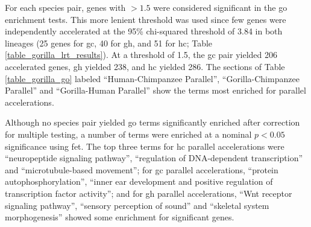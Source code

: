For each species pair, genes with \lrtmin$>1.5$ were considered
significant in the \ac{go} enrichment tests. This more lenient
threshold was used since few genes were independently accelerated at
the 95\% chi-squared threshold of 3.84 in both lineages (25 genes for
\ac{gc}, 40 for \ac{gh}, and 51 for \ac{hc}; Table
\ref{table_gorilla_lrt_results}). At a \lrtmin threshold of 1.5, the
\ac{gc} pair yielded 206 accelerated genes, \ac{gh} yielded 238, and
\ac{hc} yielded 286. The sections of Table \ref{table_gorilla_go}
labeled ``Human-Chimpanzee Parallel'', ``Gorilla-Chimpanzee Parallel''
and ``Gorilla-Human Parallel'' show the terms most enriched for
parallel accelerations.

Although no species pair yielded \ac{go} terms significantly enriched
after correction for multiple testing, a number of terms were enriched
at a nominal $p<0.05$ significance using \ac{fet}. The top three terms
for \ac{hc} parallel accelerations were ``neuropeptide signaling
pathway'', ``regulation of DNA-dependent transcription'' and
``microtubule-based movement''; for \ac{gc} parallel accelerations,
``protein autophosphorylation'', ``inner ear development and positive
regulation of transcription factor activity''; and for \ac{gh}
parallel accelerations, ``Wnt receptor signaling pathway'', ``sensory
perception of sound'' and ``skeletal system morphogenesis'' showed
some enrichment for significant genes.

